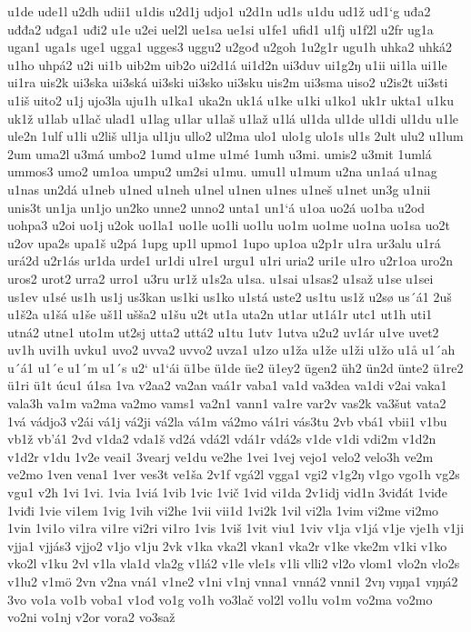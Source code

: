 u1de
ude1l
u2dh
udii1
u1dis
u2d1j
udjo1
u2d1n
ud1s
u1du
ud1ž
ud1`g
uđa2
uđđa2
uđga1
uđi2
u1e
u2ei
uel2l
ue1sa
ue1si
u1fe1
ufid1
u1fj
u1f2l
u2fr
ug1a
ugan1
uga1s
uge1
ugga1
ugges3
uggu2
u2gođ
u2goh
1u2g1r
ugu1h
uhka2
uhká2
u1ho
uhpá2
u2i
ui1b
uib2m
uib2o
ui2d1á
ui1d2n
ui3duv
ui1g2ŋ
u1ii
ui1la
ui1le
ui1ra
uis2k
ui3ska
ui3ská
ui3ski
ui3sko
ui3sku
uis2m
ui3sma
uiso2
u2is2t
ui3sti
u1iš
uito2
u1j
ujo3la
uju1h
u1ka1
uka2n
uk1á
u1ke
u1ki
u1ko1
uk1r
ukta1
u1ku
uk1ž
u1lab
u1lač
ulad1
u1lag
u1lar
u1laš
u1laž
u1lá
ul1da
ul1de
ul1di
ul1du
u1le
ule2n
1ulf
u1li
u2liš
ul1ja
ul1ju
ullo2
ul2ma
ulo1
ulo1g
ulo1s
ul1s
2ult
ulu2
u1lum
2um
uma2l
u3má
umbo2
1umd
u1me
u1mé
1umh
u3mi.
umis2
u3mit
1umlá
ummos3
umo2
um1oa
umpu2
um2si
u1mu.
umu1l
u1mum
u2na
un1aá
u1nag
u1nas
un2dá
u1neb
u1ned
u1neh
u1nel
u1nen
u1nes
u1neš
u1net
un3g
u1nii
unis3t
un1ja
un1jo
un2ko
unne2
unno2
unta1
un1`á
u1oa
uo2á
uo1ba
u2od
uohpa3
u2oi
uo1j
u2ok
uo1la1
uo1le
uo1li
uo1lu
uo1m
uo1me
uo1na
uo1sa
uo2t
u2ov
upa2s
upa1š
u2pá
1upg
up1l
upmo1
1upo
up1oa
u2p1r
u1ra
ur3alu
u1rá
urá2d
u2r1ás
ur1da
urde1
ur1di
u1re1
urgu1
u1ri
uria2
uri1e
u1ro
u2r1oa
uro2n
uros2
urot2
urra2
urro1
u3ru
ur1ž
u1s2a
u1sa.
u1sai
u1sas2
u1saž
u1se
u1sei
us1ev
u1sé
us1h
us1j
us3kan
us1ki
us1ko
u1stá
uste2
us1tu
us1ž
u2sø
us´á1
2uš
u1š2a
u1šá
u1še
uš1l
ušša2
u1šu
u2t
ut1a
uta2n
ut1ar
ut1á1r
utc1
ut1h
uti1
utná2
utne1
uto1m
ut2sj
utta2
uttá2
u1tu
1utv
1utva
u2u2
uv1ár
u1ve
uvet2
uv1h
uvi1h
uvku1
uvo2
uvva2
uvvo2
uvza1
u1zo
u1ža
u1že
u1ži
u1žo
u1å
u1´ah
u´á1
u1´e
u1´m
u1´s
u2`
u1`ái
ü1be
ü1de
üe2
ü1ey2
ügen2
üh2
ün2d
ünte2
ü1re2
ü1ri
ü1t
úcu1
ú1sa
1va
v2aa2
va2an
vaá1r
vaba1
va1d
va3dea
va1di
v2ai
vaka1
vala3h
va1m
va2ma
va2mo
vams1
va2n1
vann1
va1re
var2v
vas2k
va3šut
vata2
1vá
vádjo3
v2ái
vá1j
vá2ji
vá2la
vá1m
vá2mo
vá1ri
vás3tu
2vb
vbá1
vbii1
v1bu
vb1ž
vb'á1
2vd
v1da2
vda1š
vd2á
vdá2l
vdá1r
vdá2s
v1de
v1di
vdi2m
v1d2n
v1d2r
v1du
1v2e
veai1
3vearj
ve1du
ve2he
1vei
1vej
vejo1
velo2
velo3h
ve2m
ve2mo
1ven
vena1
1ver
ves3t
ve1ša
2v1f
vgá2l
vgga1
vgi2
v1g2ŋ
v1go
vgo1h
vg2s
vgu1
v2h
1vi
1vi.
1via
1viá
1vib
1vic
1vič
1vid
vi1da
2v1idj
vid1n
3viđát
1viđe
1viđi
1vie
vi1em
1vig
1vih
vi2he
1vii
vii1d
1vi2k
1vil
vi2la
1vim
vi2me
vi2mo
1vin
1vi1o
vi1ra
vi1re
vi2ri
vi1ro
1vis
1viš
1vit
viu1
1viv
v1ja
v1já
v1je
vje1h
v1ji
vjja1
vjjás3
vjjo2
v1jo
v1ju
2vk
v1ka
vka2l
vkan1
vka2r
v1ke
vke2m
v1ki
v1ko
vko2l
v1ku
2vl
v1la
vla1d
vla2g
v1lá2
v1le
vle1s
v1li
vlli2
vl2o
vlom1
vlo2n
vlo2s
v1lu2
v1mö
2vn
v2na
vná1
v1ne2
v1ni
v1nj
vnna1
vnná2
vnni1
2vŋ
vŋŋa1
vŋŋá2
3vo
vo1a
vo1b
voba1
v1ođ
vo1g
vo1h
vo3lač
vol2l
vo1lu
vo1m
vo2ma
vo2mo
vo2ni
vo1nj
v2or
vora2
vo3saž
